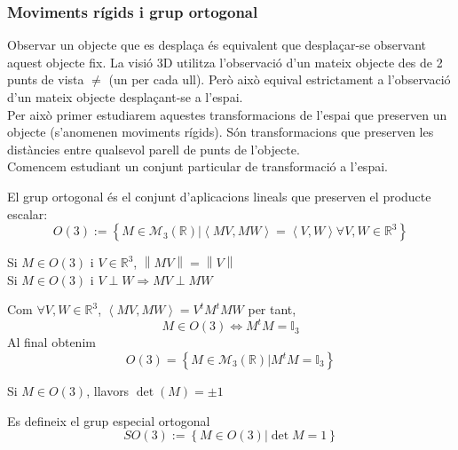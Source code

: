 \documentclass[../main.tex]{subfiles}
\begin{document}
\subsubsection{Moviments rígids i grup ortogonal}
Observar un objecte que es desplaça és equivalent que desplaçar-se observant aquest objecte fix.
La visió 3D utilitza l'observació d'un mateix objecte des de 2 punts de vista $\neq$ (un per cada
ull). Però això equival estrictament a l'observació d'un mateix objecte desplaçant-se a l'espai.\\
Per això primer estudiarem aquestes transformacions de l'espai que preserven un objecte (s'anomenen
moviments rígids). Són transformacions que preserven les distàncies entre qualsevol parell de punts
de l'objecte.\\
Comencem estudiant un conjunt particular de transformació a l'espai.
\begin{definicio}
    El grup ortogonal és el conjunt d'aplicacions lineals que preserven el producte escalar:
    \begin{displaymath}
        O(3) := \left\{M \in \mathcal{M}_3\left(\mathbb{R}\right) | \left\langle MV, MW \right\rangle = \left\langle V, W\right\rangle \forall V, W \in \mathbb{R}^3 \right\}
    \end{displaymath}
\end{definicio}
\begin{obs}
    Si $M \in O(3)$ i $V \in \mathbb{R}^3$, $\left\lVert MV\right\rVert = \left\lVert V\right\rVert$\\
    Si $M\in O(3)$ i $V\perp W \Rightarrow MV \perp MW$
\end{obs}
Com $\forall V, W \in \mathbb{R}^3$, $\left\langle MV, MW\right\rangle = V^tM^tMW$ per tant,
\begin{displaymath}
    M \in O(3) \Leftrightarrow M^tM = \mathbb{I}_3
\end{displaymath}
Al final obtenim
\begin{displaymath}
    O(3) = \left\{M \in \mathcal{M}_3\left(\mathbb{R}\right) | M^tM = \mathbb{I}_3\right\}
\end{displaymath}
\begin{proposicio}
    Si $M \in O(3)$, llavors $\det\left(M\right) = \pm 1$
\end{proposicio}
\begin{definicio}
    Es defineix el grup especial ortogonal
    \begin{displaymath}
        SO(3) := \left\{M \in O(3) | \det{M} = 1\right\}
    \end{displaymath}
\end{definicio}
\end{document}
